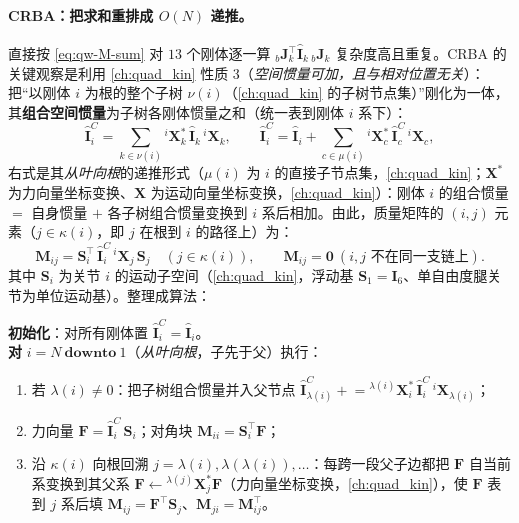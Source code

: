 \paragraph{CRBA：把求和重排成 $O(N)$ 递推。}
直接按 \cref{eq:qw-M-sum} 对 $13$ 个刚体逐一算 ${}_{b}\boldsymbol{J}_k^\top\hat{\mathbf{I}}_k\,{}_{b}\boldsymbol{J}_k$ 复杂度高且重复。CRBA 的关键观察是利用 \cref{ch:quad_kin} 性质 3（\emph{空间惯量可加，且与相对位置无关}）：把“以刚体 $i$ 为根的整个子树 $\nu(i)$（\cref{ch:quad_kin} 的子树节点集）”刚化为一体，其\textbf{组合空间惯量}为子树各刚体惯量之和（统一表到刚体 $i$ 系下）：
\begin{equation}
  \hat{\mathbf{I}}_i^{C}=\sum_{k\in\nu(i)}{}^{i}\mathbf{X}_k^{*}\,\hat{\mathbf{I}}_k\,{}^{i}\mathbf{X}_k,
  \qquad
  \hat{\mathbf{I}}_i^{C}=\hat{\mathbf{I}}_i+\sum_{c\in\mu(i)}{}^{i}\mathbf{X}_c^{*}\,\hat{\mathbf{I}}_c^{C}\,{}^{i}\mathbf{X}_c,
  \label{eq:qw-crba-Ic}
\end{equation}
右式是其\emph{从叶向根}的递推形式（$\mu(i)$ 为 $i$ 的直接子节点集，\cref{ch:quad_kin}；$\mathbf{X}^{*}$ 为力向量坐标变换、$\mathbf{X}$ 为运动向量坐标变换，\cref{ch:quad_kin}）：刚体 $i$ 的组合惯量 $=$ 自身惯量 $+$ 各子树组合惯量变换到 $i$ 系后相加。由此，质量矩阵的 $(i,j)$ 元素（$j\in\kappa(i)$，即 $j$ 在根到 $i$ 的路径上）为\cite{yu2021quadruped}：
\begin{equation}
  \boldsymbol{M}_{ij}=\mathbf{S}_i^\top\,\hat{\mathbf{I}}_i^{C}\,{}^{i}\mathbf{X}_j\,\mathbf{S}_j
  \quad(j\in\kappa(i)),
  \qquad \boldsymbol{M}_{ij}=\mathbf{0}\ (\text{$i,j$ 不在同一支链上}).
  \label{eq:qw-crba-Mij}
\end{equation}
其中 $\mathbf{S}_i$ 为关节 $i$ 的运动子空间（\cref{ch:quad_kin}，浮动基 $\mathbf{S}_1=\mathbf{I}_6$、单自由度腿关节为单位运动基）。整理成算法：

\begin{algo}\label{algo:qw-crba}
\textbf{初始化}：对所有刚体置 $\hat{\mathbf{I}}_i^{C}=\hat{\mathbf{I}}_i$。\\
\textbf{对} $i=N\ \textbf{downto}\ 1$（\emph{从叶向根}，子先于父）执行：
\begin{enumerate}
  \item 若 $\lambda(i)\neq0$：把子树组合惯量并入父节点 $\hat{\mathbf{I}}_{\lambda(i)}^{C}\mathrel{+}={}^{\lambda(i)}\mathbf{X}_i^{*}\,\hat{\mathbf{I}}_i^{C}\,{}^{i}\mathbf{X}_{\lambda(i)}$；
  \item 力向量 $\boldsymbol{F}=\hat{\mathbf{I}}_i^{C}\,\mathbf{S}_i$；对角块 $\boldsymbol{M}_{ii}=\mathbf{S}_i^\top\boldsymbol{F}$；
  \item 沿 $\kappa(i)$ 向根回溯 $j=\lambda(i),\lambda(\lambda(i)),\dots$：每跨一段父子边都把 $\boldsymbol{F}$ 自当前系变换到其父系 $\boldsymbol{F}\leftarrow{}^{\lambda(j)}\mathbf{X}_{j}^{*}\boldsymbol{F}$（力向量坐标变换，\cref{ch:quad_kin}），使 $\boldsymbol{F}$ 表到 $j$ 系后填 $\boldsymbol{M}_{ij}=\boldsymbol{F}^\top\mathbf{S}_j$、$\boldsymbol{M}_{ji}=\boldsymbol{M}_{ij}^\top$。
\end{enumerate}
\end{algo}

